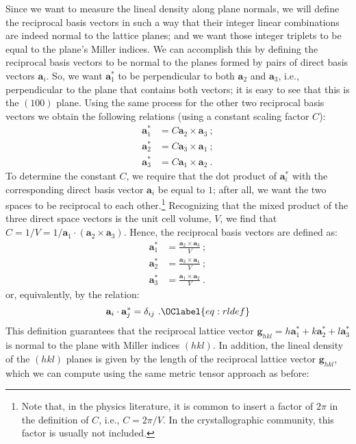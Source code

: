 Since we want to measure the lineal density along plane normals, we will define the reciprocal basis vectors in such a way that their integer linear combinations are indeed normal to the lattice planes; and we want those integer triplets to be equal to the plane's Miller indices.  We can accomplish this by defining the reciprocal basis vectors to be normal to the planes formed by pairs of direct basis vectors $\mathbf{a}_i$.  So, we want $\mathbf{a}^{\ast}_1$ to be perpendicular to both $\mathbf{a}_2$ and $\mathbf{a}_3$, i.e., perpendicular to the plane that contains both vectors; it is easy to see that this is the $(100)$ plane.  Using the same process for the other two reciprocal basis vectors we obtain the following relations (using a constant scaling factor $C$):
\begin{align*}
	\mathbf{a}^{\ast}_1 &= C \mathbf{a}_2\times\mathbf{a}_3 \ ;\\
	\mathbf{a}^{\ast}_2 &= C \mathbf{a}_3\times\mathbf{a}_1 \ ;\\
	\mathbf{a}^{\ast}_3 &= C \mathbf{a}_1\times\mathbf{a}_2 \ .	
\end{align*}
To determine the constant $C$, we require that the dot product of $\mathbf{a}_i^{\ast}$ with the corresponding direct basis vector $\mathbf{a}_i$ be equal to $1$; after all, we want the two spaces to be reciprocal to each other.\footnote{Note that, in the physics literature, it is common to insert a factor of $2\pi$ in the definition of $C$, i.e., $C=2\pi/V$.  In the crystallographic community, this factor is usually not included.} Recognizing that the mixed product of the three direct space vectors is the unit cell volume, $V$, we find that $C=1/V=1/\mathbf{a}_1\cdot(\mathbf{a}_2\times\mathbf{a}_3)$.  Hence, the reciprocal basis vectors are defined as:
\begin{align}
	\mathbf{a}^{\ast}_1 &= \frac{\mathbf{a}_2\times\mathbf{a}_3}{V} \ ;\nonumber\\
	\mathbf{a}^{\ast}_2 &= \frac{\mathbf{a}_3\times\mathbf{a}_1}{V} \ ;\\
	\mathbf{a}^{\ast}_3 &= \frac{\mathbf{a}_1\times\mathbf{a}_2}{V} \ .\nonumber	
\end{align}
or, equivalently, by the relation:
\begin{equation}
	\mathbf{a}_i\cdot\mathbf{a}^{\ast}_j = \delta_{ij} \ .\OClabel{eq:rldef}
\end{equation}
This definition guarantees that the reciprocal lattice vector $\mathbf{g}_{hkl}=h\mathbf{a}_1^{\ast}+k\mathbf{a}_2^{\ast}+l\mathbf{a}_3^{\ast}$ is normal to the plane with Miller indices $(hkl)$.  In addition, the lineal density of the $(hkl)$ planes is given by the length of the reciprocal lattice vector $\mathbf{g}_{hkl}$, which we can compute using the same metric tensor approach as before:
